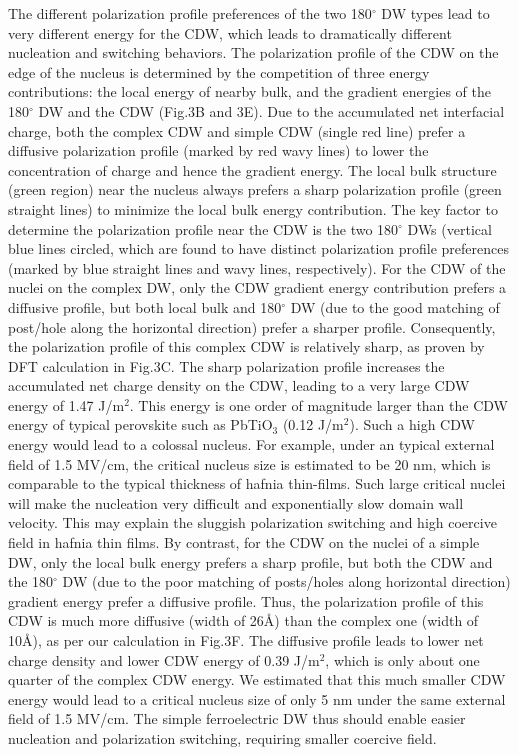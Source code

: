 \documentclass[12pt]{article}
\begin{document}
The different polarization profile preferences of the two 180$^\circ$ DW types lead to very different energy for the CDW, which leads to dramatically different nucleation and switching behaviors.
The polarization profile of the CDW on the edge of the nucleus is determined by the competition of three energy contributions: the local energy of nearby bulk, and the gradient energies of the 180$^\circ$ DW and the CDW (Fig.3B and 3E).
Due to the accumulated net interfacial charge, both the complex CDW and simple CDW (single red line) prefer a diffusive polarization profile (marked by red wavy lines) to lower the concentration of charge and hence the gradient energy. 
The local bulk structure (green region) near the nucleus always prefers a sharp polarization profile (green straight lines) to minimize the local bulk energy contribution.
The key factor to determine the polarization profile near the CDW is the two 180$^\circ$ DWs (vertical blue lines circled, which are found to have distinct polarization profile preferences (marked by blue straight lines and wavy lines, respectively).
For the CDW of the nuclei on the complex DW, only the CDW gradient energy contribution prefers a diffusive profile, but both local bulk and 180$^\circ$ DW (due to the good matching of post/hole along the horizontal direction) prefer a sharper profile.
Consequently, the polarization profile of this complex CDW is relatively sharp, as proven by DFT calculation in Fig.3C. 
The sharp polarization profile increases the accumulated net charge density on the CDW, leading to a very large CDW energy of 1.47 J/m$^2$\cite{miller60p1460}. 
This energy is one order of magnitude larger than the CDW energy of typical perovskite such as PbTiO$_3$ (0.12 J/m$^2$). 
Such a high CDW energy would lead to a colossal nucleus. 
For example, under an typical external field of 1.5 MV/cm, the critical nucleus size is estimated to be 20 nm, which is comparable to the typical thickness of hafnia thin-films.
Such large critical nuclei will make the nucleation very difficult and exponentially slow domain wall velocity. 
This may explain the sluggish polarization switching and high coercive field in hafnia thin films. 
By contrast, for the CDW on the nuclei of a simple DW, only the local bulk energy prefers a sharp profile, but both the CDW and the 180$^\circ$ DW (due to the poor matching of posts/holes along horizontal direction) gradient energy prefer a diffusive profile.
Thus, the polarization profile of this CDW is much more diffusive (width of 26\AA) than the complex one (width of 10\AA), as per our calculation in Fig.3F.
The diffusive profile leads to lower net charge density and lower CDW energy of 0.39 J/m$^2$, which is only about one quarter of the complex CDW energy. 
We estimated that this much smaller CDW energy would lead to a critical nucleus size of only 5 nm under the same external field of 1.5 MV/cm. 
The simple ferroelectric DW thus should enable easier nucleation and polarization switching, requiring smaller coercive field.
\end{document}
